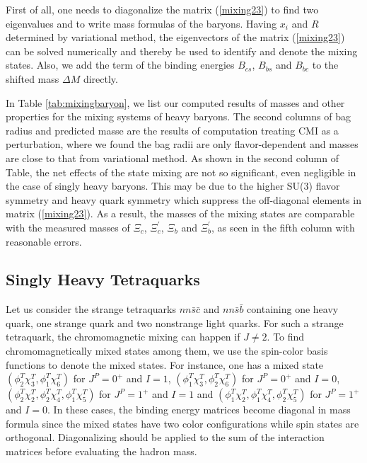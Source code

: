 \documentclass[prt,twocolumn,floatfix,nofootinbib]{revtex4}
\begin{document}
First of all, one needs to diagonalize the matrix (\ref{mixing23}) to find two eigenvalues and to write mass formulas of the baryons. Having $x_{i}$ and $R$ determined by variational method, the eigenvectors of the matrix (\ref{mixing23}) can be solved numerically and thereby be used to identify and denote the mixing states. Also, we add the term of the binding energies $B_{cs}$, $B_{bs}$ and $B_{bc}$ to the shifted mass $\Delta M$ directly.

In Table \ref{tab:mixingbaryon}, we list our computed results of masses and other properties for the mixing systems of heavy baryons.
The second columns of bag radius and predicted masse are the results of computation treating CMI as a perturbation, where we found the bag radii are only flavor-dependent and masses are close to that from variational method.
As shown in the second column of Table, the net effects of the state mixing are not so significant, even negligible in the case of singly heavy baryons.
This may be due to the higher SU(3) flavor symmetry and heavy quark symmetry which suppress the off-diagonal elements in matrix (\ref{mixing23}).
As a result, the masses of the mixing states are comparable with the measured masses of $\Xi_{c}$, $\Xi_{c}^{\prime}$, $\Xi_{b}$ and $\Xi_{b}^{\prime}$, as seen in the fifth column with reasonable errors.


\subsection{Singly Heavy Tetraquarks}
Let us consider the strange tetraquarks $nn\bar{s}\bar{c}$ and $nn\bar{s}\bar{b}$ containing one heavy quark, one strange quark and two nonstrange light quarks. For such a strange tetraquark, the chromomagnetic mixing can happen if $J\neq2$. To find chromomagnetically mixed states among them, we use the spin-color basis functions to denote the mixed states. For instance, one has a mixed state $(\phi_{2}^{T}\chi_{3}^{T},\phi_{1}^{T}\chi_{6}^{T})$ for $J^{P}=0^{+}$ and $I=1$,
$(\phi_{1}^{T}\chi_{3}^{T},\phi_{2}^{T}\chi_{6}^{T})$ for $J^{P}=0^{+}$ and $I=0$,
$(\phi_{2}^{T}\chi_{2}^{T},\phi_{2}^{T}\chi_{4}^{T},\phi_{1}^{T}\chi_{5}^{T})$ for $J^{P}=1^{+}$ and $I=1$ and
$(\phi_{1}^{T}\chi_{2}^{T},\phi_{1}^{T}\chi_{4}^{T},\phi_{2}^{T}\chi_{5}^{T})$ for $J^{P}=1^{+}$ and $I=0$.
In these cases, the binding energy matrices become diagonal in mass formula since the mixed states have two color configurations while spin states are orthogonal.
Diagonalizing should be applied to the sum of the interaction matrices before evaluating the hadron mass.
\end{document}
